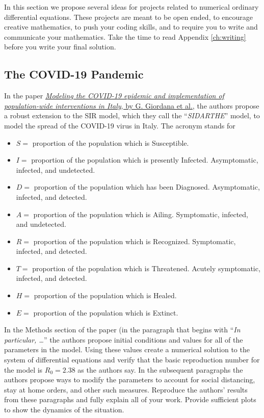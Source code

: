 \documentclass[
]{book}
\providecommand{\tightlist}{%
  \setlength{\itemsep}{0pt}\setlength{\parskip}{0pt}}
\theoremstyle{definition}
\theoremstyle{definition}
\theoremstyle{definition}
\theoremstyle{remark}
\begin{document}
In this section we propose several ideas for projects related to
numerical ordinary differential equations. These projects are meant to
be open ended, to encourage creative mathematics, to push your coding
skills, and to require you to write and communicate your mathematics.
Take the time to read Appendix \ref{ch:writing} before you write your final solution.

\hypertarget{the-covid-19-pandemic}{%
\subsection{The COVID-19 Pandemic}\label{the-covid-19-pandemic}}

In the paper \href{https://www.nature.com/articles/s41591-020-0883-7}{\emph{Modeling the COVID-19 epidemic and implementation of population-wide interventions in Italy}, by G. Giordana et al.}, the authors propose a robust extension to the SIR model, which they call the ``\emph{SIDARTHE}'' model, to model the spread of the COVID-19 virus in Italy. The acronym stands for

\begin{itemize}
\tightlist
\item
  \(S=\) proportion of the population which is Susceptible.
\item
  \(I=\) proportion of the population which is presently Infected. Asymptomatic, infected, and undetected.
\item
  \(D=\) proportion of the population which has been Diagnosed. Asymptomatic, infected, and detected.
\item
  \(A=\) proportion of the population which is Ailing. Symptomatic, infected, and undetected.
\item
  \(R=\) proportion of the population which is Recognized. Symptomatic, infected, and detected.
\item
  \(T=\) proportion of the population which is Threatened. Acutely symptomatic, infected, and detected.
\item
  \(H=\) proportion of the population which is Healed.\\
\item
  \(E=\) proportion of the population which is Extinct.
\end{itemize}

In the Methods section of the paper (in the paragraph that begins with ``\emph{In particular, \ldots{}}'' the authors propose initial conditions and values for all of the parameters in the model. Using these values create a numerical solution to the system of differential equations and verify that the basic reproduction number for the model is \(R_0 = 2.38\) as the authors say. In the subsequent paragraphs the authors propose ways to modify the parameters to account for social distancing, stay at home orders, and other such measures. Reproduce the authors' results from these paragraphs and fully explain all of your work. Provide sufficient plots to show the dynamics of the situation.
\end{document}
